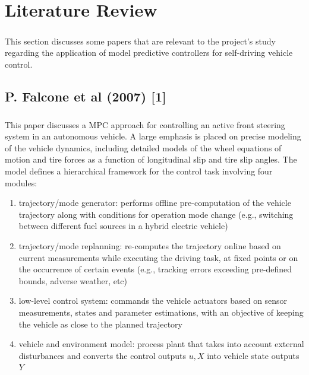 \chapter{Literature Review}
\paragraph{}
This section discusses some papers that are relevant to the project's study regarding the application of model predictive controllers for self-driving vehicle control.

\section{P. Falcone et al (2007) [1]}
\paragraph{}
This paper discusses a MPC approach for controlling an active front steering system in an autonomous vehicle. A large emphasis is placed on precise modeling of the vehicle dynamics, including detailed models of the wheel equations of motion and tire forces as a function of longitudinal slip and tire slip angles. The model defines a hierarchical framework for the control task involving four modules:
\vspace{-2.5mm}

\begin{enumerate}[label=(\arabic*), itemsep=-0.3em]
    \item trajectory/mode generator: performs offline pre-computation of the vehicle trajectory along with conditions for operation mode change (e.g., switching between different fuel sources in a hybrid electric vehicle)
    \item trajectory/mode replanning: re-computes the trajectory online based on current measurements while executing the driving task, at fixed points or on the occurrence of certain events (e.g., tracking errors exceeding pre-defined bounds, adverse weather, etc)
    \item low-level control system: commands the vehicle actuators based on sensor measurements, states and parameter estimations, with an objective of keeping the vehicle as close to the planned trajectory
    \item vehicle and environment model: process plant that takes into account external disturbances and converts the control outputs $u, X$ into vehicle state outputs $Y$
\end{enumerate}

